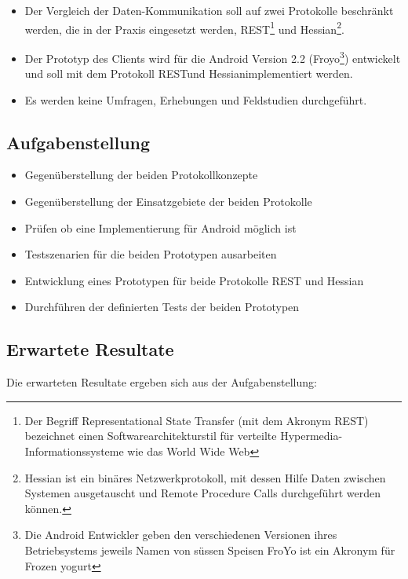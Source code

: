 \documentclass[listof=totocnumbered, bibliography=totocnumbered]{scrreprt}
\begin{document}
  \begin{itemize}
    \item Der Vergleich der Daten-Kommunikation soll auf zwei Protokolle
          beschränkt werden, die in der Praxis eingesetzt werden,
          \ac{REST}\footnote[1]{
            Der Begriff Representational State Transfer (mit dem Akronym
            REST) bezeichnet einen Softwarearchitekturstil für verteilte
            Hypermedia-Informationssysteme wie das World Wide Web} und
          Hessian\footnote[2]{
            Hessian ist ein binäres Netzwerkprotokoll, mit
            dessen Hilfe Daten zwischen Systemen ausgetauscht und Remote
            Procedure Calls durchgeführt werden können.}.
    \item Der Prototyp des Clients wird für die Android Version 2.2
          (Froyo\footnote[3]{
            Die Android Entwickler geben den verschiedenen Versionen
            ihres Betriebsystems jeweils Namen von süssen Speisen FroYo
            ist ein Akronym für Frozen yogurt}) entwickelt und soll mit dem
          Protokoll \ac{REST}\footnotemark[1] und Hessian\footnotemark[2]
          implementiert werden.
    \item Es werden keine Umfragen, Erhebungen und Feldstudien
          durchgeführt.
  \end{itemize}
  
  \newpage
  
  \subsection{Aufgabenstellung}
  
  \begin{itemize}
    \item Gegenüberstellung der beiden Protokollkonzepte
    \item Gegenüberstellung der Einsatzgebiete der beiden Protokolle
    \item Prüfen ob eine Implementierung für Android möglich ist
    \item Testszenarien für die beiden Prototypen ausarbeiten
    \item Entwicklung eines Prototypen für beide Protokolle \ac{REST} und
          Hessian
    \item Durchführen der definierten Tests der beiden Prototypen
  \end{itemize}
  
  \subsection{Erwartete Resultate}
  Die erwarteten Resultate ergeben sich aus der Aufgabenstellung:
  
\end{document}
